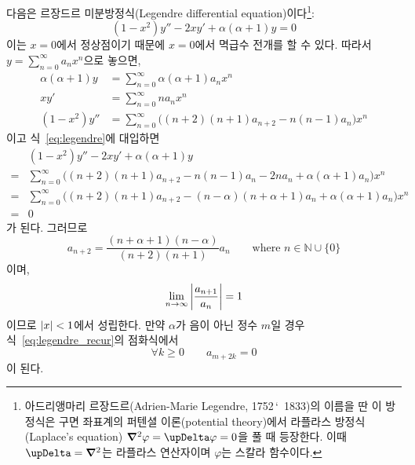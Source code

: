 \documentclass[../engineering_mathematics_lecture_note.tex]{subfiles}
\begin{document}
\begin{example}
    다음은 르장드르 미분방정식(Legendre differential equation)이다\footnote{아드리앵마리 르장드르(Adrien-Marie Legendre, 1752\,\char`~1833)의 이름을 딴 이 방정식은 구면 좌표계의 퍼텐셜 이론(potential theory)에서 라플라스 방정식(Laplace's equation) $\grad^2 \varphi = \upDelta \varphi = 0$을 풀 때 등장한다. 이때 $\upDelta = \grad^2$는 라플라스 연산자이며 $\varphi$는 스칼라 함수이다.}:
    \begin{equation} \label{eq:legendre}
        (1 - x^2)y'' - 2xy' + \alpha(\alpha + 1)y = 0
    \end{equation}
    이는 $x = 0$에서 정상점이기 때문에 $x = 0$에서 멱급수 전개를 할 수 있다.
    따라서 $y = \sum^{\infty}_{n = 0} a_n x^n$으로 놓으면,
    \begin{align*}
        \alpha (\alpha + 1) y &= \sum^{\infty}_{n = 0} \alpha (\alpha + 1) a_n x^n\\
        xy' &= \sum^{\infty}_{n = 0} n a_n x^n\\
        (1 - x^2) y'' &= \sum^{\infty}_{n = 0} \bigl((n + 2)(n + 1) a_{n + 2} - n(n - 1) a_n \bigr) x^n
    \end{align*}
    이고 식~\ref{eq:legendre}에 대입하면
    \begin{align*}
        &(1 - x^2)y'' - 2xy' + \alpha (\alpha + 1) y\\
        = &\sum^{\infty}_{n = 0} \bigl((n + 2)(n + 1) a_{n + 2} - n(n - 1) a_n - 2na_n + \alpha (\alpha + 1) a_n \bigr) x^n\\
        = &\sum^{\infty}_{n = 0}\bigl((n + 2)(n + 1) a_{n + 2} - (n - \alpha)(n + \alpha + 1)a_n + \alpha (\alpha + 1) a_n \bigr) x^n\\
        = &0
    \end{align*}
    가 된다.
    그러므로
    \begin{equation} \label{eq:legendre_recur}
        a_{n + 2} = \frac{(n + \alpha + 1)(n - \alpha)}{(n + 2)(n + 1)} a_n \qquad \text{where } n \in \mathbb N \cup \{0\}
    \end{equation}
    이며,
    \begin{equation*}
        \lim_{n \to \infty} \abs{\frac{a_{n + 1}}{a_n}} = 1
    \end{equation*}
    이므로 $\abs{x} < 1$에서 성립한다.
    만약 $\alpha$가 음이 아닌 정수 $m$일 경우 식~\ref{eq:legendre_recur}의 점화식에서
    \begin{equation*}
        \forall k \geq 0 \qquad a_{m + 2k} = 0
    \end{equation*}
    이 된다.

\end{example}
\end{document}
